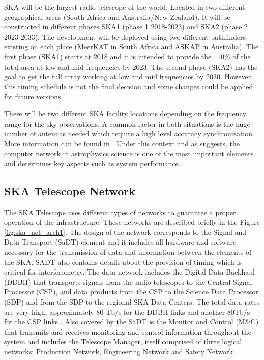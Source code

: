 SKA will be the largest radio-telescope of the 
world. Located in two different geographical areas (South-Africa and 
Australia/New Zealand). It will be 
constructed in different phases SKA1 (phase 1 2018-2023) and SKA2 (phase 2 
2023-2033). The development will be deployed using two different pathfinders 
existing on each place (MeerKAT in South Africa and ASKAP in Australia). 
The first phase (SKA1) starts at 2018 and it is intended to provide the ~10\% 
of the total area at low and 
mid frequencies by 2023. The second phase (SKA2) has the goal to get the full
array working at low and mid frequencies by 2030. However, this timing schedule is
not the final decision and some changes could be applied for future versions.

There will be two different SKA facility locations depending on the frequency 
range for the sky observations. A common factor in both situations is the 
huge number of antennas needed which require a high level accuracy 
synchronization. More information can be found in  
\cite{ska:baseline_description_v2}. Under this context and as \cite{HUANG201727} suggests, the computer network in astrophysics science is one of the most important elements and determines key aspects such as system performance.

\subsection{SKA Telescope Network} \label{subsec:ska-telescope}

The SKA Telescope uses different types of networks to guarantee a proper operation of the infrastructure. These networks are described briefly in the Figure \ref{fig:ska_net_arch1}. The design of the network corresponds to the Signal and Data Transport (SaDT) element \cite{ska:sadt_website} and it includes all hardware and software necessary for the transmission of data and information between the elements of the SKA. SADT also contains details about the provision of timing which is critical for interferometry.
The data network includes the Digital Data Backhaul (DDBH) that transports signals from the radio telescopes to the Central Signal Processor (CSP), and data products from the CSP to the Science Data Processor (SDP) and from the SDP to the regional SKA Data Centers. The total data rates are very high, approximately 80 Tb/s for the DDBH links and another 80Tb/s for the CSP links \cite{ska:consortia-news}. 
Also covered by the SaDT is the Monitor and Control (M\&C) that transmits and receives monitoring and control information throughout the system and includes the Telescope Manager, itself comprised of three logical networks: Production Network, Engineering Network and Safety Network.

